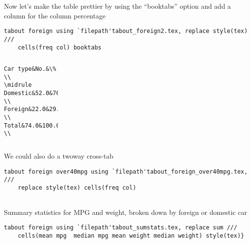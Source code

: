 \documentclass[fleqn, handout, 10pt]{beamer}
\def\results{S:/trainings/exporting_stata_tables_figures/results}
\begin{document}
\begin{frame}[fragile]{ Now let's make the table prettier by using the ``booktabs'' option and add a column for the column percentage}

    \vspace{.25cm}
    \begin{lstlisting}
tabout foreign using `filepath'tabout_foreign2.tex, replace style(tex) ///
    cells(freq col) booktabs
    \end{lstlisting}
    \pause
    \begin{columns}[T]
	    \begin{lstlisting}
Car type&No.&\% \\
\midrule
Domestic&52.0&70.3 \\
Foreign&22.0&29.7 \\
Total&74.0&100.0 \\
	    \end{lstlisting}
	    \begin{tabular}{lrr}
		 
	    \end{tabular}
    \end{columns}
\end{frame}

\begin{frame}[fragile]{We could also do a twoway cross-tab}
    \vspace{.25cm}
    \begin{lstlisting}
tabout foreign over40mpg using `filepath'tabout_foreign_over40mpg.tex, ///
	replace style(tex) cells(freq col)
    \end{lstlisting}
    \pause
    \vspace{.25cm}
    \begin{tabular}{lrrrrrr}
	
    \end{tabular}
\end{frame}

\begin{frame}[fragile]{Summary statistics for MPG and weight, broken down by foreign or domestic car}
    \vspace{.25cm}
    \begin{lstlisting}
tabout foreign using `filepath'tabout_sumstats.tex, replace sum ///
	cells(mean mpg	median mpg mean weight median weight) style(tex)}
    \end{lstlisting}
    \pause
    \vspace{.5cm}
    \begin{tabular}{lrrrrrr}
	
    \end{tabular}
\end{frame}
\end{document}
